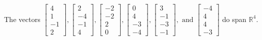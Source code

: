 \begin{exercise}
\begin{exerciseStatement}
  \end{exerciseStatement}
  \begin{exerciseAnswer}
   The vectors \(\left[\begin{array}{r}
4 \\
1 \\
-1 \\
2
\end{array}\right] , \left[\begin{array}{r}
2 \\
-4 \\
-1 \\
4
\end{array}\right] , \left[\begin{array}{r}
-2 \\
-2 \\
2 \\
0
\end{array}\right] , \left[\begin{array}{r}
0 \\
4 \\
-3 \\
-4
\end{array}\right] , \left[\begin{array}{r}
3 \\
-1 \\
-3 \\
-1
\end{array}\right] , \text{ and } \left[\begin{array}{r}
-4 \\
4 \\
4 \\
-3
\end{array}\right]\) 
  	 do  
	span \(\mathbb{R}^4\).
  


  \end{exerciseAnswer}
\end{exercise}